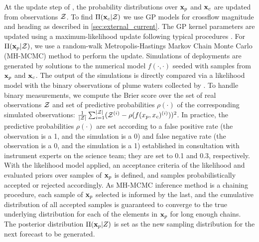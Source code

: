 At the update step of \PHUMES, the probability distributions over $\mathbf{x}_p$ and $\mathbf{x}_c$ are updated from observations $\mathcal{Z}$. To find $\Pi(\mathbf{x}_c|\mathcal{Z})$ we use GP models for crossflow magnitude and heading as described in \cref{sec:external_current}. The GP kernel parameters are updated using a maximum-likelihood update following typical procedures \autocite{Rasmussen2004}. For $\Pi(\mathbf{x}_p | \mathcal{Z})$, we use a random-walk Metropolis-Hastings Markov Chain Monte Carlo (MH-MCMC) method \autocite{metropolis1953equation} to perform the update. Simulations of deployments are generated by solutions to the numerical model $f(\cdot, \cdot)$ seeded with samples from $\mathbf{x}_p$ and $\mathbf{x}_c$. The output of the simulations is directly compared via a likelihood model with the binary observations of plume waters collected by \Sentry. To handle binary measurements, we compute the Brier score \autocite{brier1950verification} over the set of real observations $\mathcal{Z}$ and set of predictive probabilities $\rho(\cdot)$ of the corresponding simulated observations: $\frac{1}{|\mathcal{Z}|}\sum_{i=1}^{|\mathcal{Z}|} (\mathcal{Z}^{(i)} - \rho(f(x_p, x_c)^{(i)}))^2$. In practice, the predictive probabilities $\rho(\cdot)$ are set according to a false positive rate (the observation is a 1, and the simulation is a 0) and false negative rate (the observation is a 0, and the simulation is a 1) established in consultation with instrument experts on the science team; they are set to 0.1 and 0.3, respectively. With the likelihood model applied, an acceptance criteria of the likelihood and evaluated priors over samples of $\mathbf{x}_p$ is defined, and samples probabilistically accepted or rejected accordingly. As MH-MCMC inference method is a chaining procedure, each sample of $\mathbf{x}_p$ selected is informed by the last, and the cumulative distribution of all accepted samples is guaranteed to converge to the true underlying distribution for each of the elements in $\mathbf{x}_p$ for long enough chains. The posterior distribution $\Pi(\mathbf{x}_p | Z)$ is set as the new sampling distribution for the next forecast to be generated.


